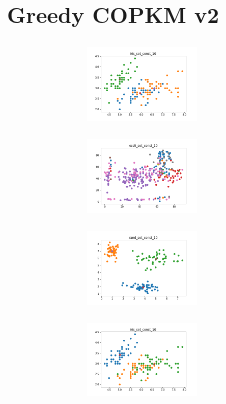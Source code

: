 \newpage

\subsection{Greedy COPKM v2}

\begin{figure}[H]    
    \centering
    \begin{subfigure}
        \centering
        \includegraphics[width=0.32\textwidth]{img/copkm2/iris_set_const_10_949004259_clust.png}
    \end{subfigure}
    \hfill
    \begin{subfigure}
        \centering
        \includegraphics[width=0.32\textwidth]{img/copkm2/ecoli_set_const_10_949004259_clust.png}
    \end{subfigure}
    \hfill
    \begin{subfigure}
        \centering
        \includegraphics[width=0.32\textwidth]{img/copkm2/rand_set_const_10_949004259_clust.png}
    \end{subfigure}
    \hfill
    \begin{subfigure}
        \centering
        \includegraphics[width=0.32\textwidth]{img/copkm2/iris_set_const_10_589741062_clust.png}
    \end{subfigure}

\end{figure}
